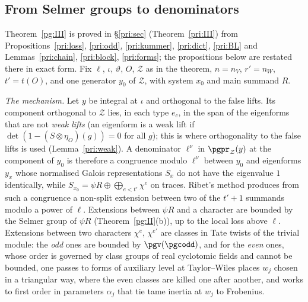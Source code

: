 \documentclass[10pt]{amsart}
\theoremstyle{definition}
\theoremstyle{remark}
\begin{document}
\subsection{From Selmer groups to denominators}\label{pg:ss-ribet}

Theorem~\ref{pg:III} is proved in \S\ref{pri:sec} (Theorem~\ref{pri:III}) from Propositions~\ref{pri:loss}, \ref{pri:odd}, \ref{pri:kummer}, \ref{pri:dict}, \ref{pri:BL} and Lemmas~\ref{pri:chain}, \ref{pri:block}, \ref{pri:forms}; the propositions below are restated there in exact form. Fix $\ell$, $\iota$, $\vartheta$, $O$, $\mathcal Z$ as in the theorem,
$n=n_V$, $r'=n_W$, $t'=t(O)$, and one generator $y_0$ of $\mathcal Z$, with system $x_0$ and main
summand $R$.

\emph{The mechanism.} Let $y$ be integral at $\iota$ and orthogonal to the false lifts. Its
component orthogonal to $\mathcal Z$ lies, in each type $e_c$, in the span of the eigenforms that
are not \emph{weak lifts} (an eigenform is a weak lift if $\det(1-(S\otimes\eta_O)(g))=0$ for all
$g$); this is where orthogonality to the false lifts is used (Lemma~\ref{pri:weak}). A denominator $\ell^\nu$ in
$\pgpr_{\mathcal Z}(y)$ at the component of $y_0$ is therefore a congruence modulo $\ell^\nu$
between $y_0$ and eigenforms $y_x$ whose normalised Galois representations $S_x$ do not have the
eigenvalue $1$ identically, while $S_{x_0}=\psi R\oplus\bigoplus_{e<t'}\chi^e$ on traces. Ribet's
method produces from such a congruence a non-split extension between two of the $t'+1$ summands
modulo a power of $\ell$. Extensions between $\psi R$ and a character are bounded by the Selmer
group of $\psi R$ (Theorem~\ref{pg:II}(b)), up to the local loss above $\ell$. Extensions between
two characters $\chi^e$, $\chi^{e'}$ are classes in Tate twists of the trivial module: the
\emph{odd} ones are bounded by $\pgv(\pgcodd)$, and for the \emph{even} ones, whose order is
governed by class groups of real cyclotomic fields and cannot be bounded, one passes to
forms of auxiliary level at Taylor--Wiles places $w_j$ chosen in a triangular way, where the
even classes are killed one after another, and works to first order in parameters $\alpha_j$ that
tie tame inertia at $w_j$ to Frobenius.
\end{document}
